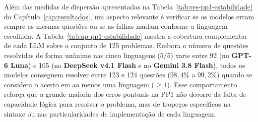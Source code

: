 \begin{table}[!htbp]
\centering
\caption[Taxa de acerto Pass@1 por modelo e linguagem na PP1]{Quantidade absoluta de aprovações ( de 125) e taxa $\passat{1}$ (\%) por modelo e linguagem de programação ($T = 0{,}0$).}
\label{tab:res-pp1-pass1}
\small
{}
\par{}
\end{table}

Além das medidas de dispersão apresentadas na Tabela~\ref{tab:res-pp1-estabilidade} do Capítulo~\ref{cap:resultados}, um aspecto relevante é verificar se os modelos erram sempre as mesmas questões ou se as falhas mudam conforme a linguagem escolhida. A Tabela~\ref{tab:ap-pp1-estabilidade} mostra a cobertura complementar de cada LLM sobre o conjunto de 125 problemas. Embora o número de questões resolvidas de forma unânime nas cinco linguagens (5/5) varie entre 92 (no \textbf{GPT-6 Luna}) e 105 (no \textbf{DeepSeek v4.1 Flash} e no \textbf{Gemini 3.8 Flash}), todos os modelos conseguem resolver entre 123 e 124 questões ($98{,}4\%$ a $99{,}2\%$) quando se considera o acerto em ao menos uma linguagem ($\ge 1$). Esse comportamento reforça que a grande maioria dos erros pontuais na PP1 não decorre da falta de capacidade lógica para resolver o problema, mas de tropeços específicos na sintaxe ou nas particularidades de implementação de cada linguagem.

